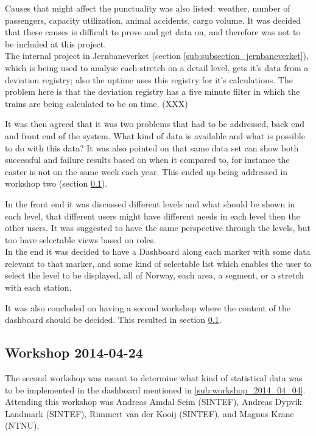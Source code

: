 Causes that might affect the punctuality was also listed: weather, number of
passengers, capacity utilization, animal accidents, cargo volume.
It was decided that these causes is difficult to prove and get data on, and
therefore was not to be included at this project.\\

The internal project in Jernbaneverket (section
\ref{sub:subsection_jernbaneverket}), which is being used to analyse each
stretch on a detail level, gets it's data from a deviation registry; also the
uptime uses this registry for it's calculations. The problem here is that the deviation registry has a five minute filter
in which the trains are being calculated to be on time. (XXX)

It was then agreed that it was two problems that had to be addressed, back end
and front end of the system. What kind of data is available and what is
possible to do with this data? It was also pointed on that same data set can 
show both successful and failure results based on when it compared to, for 
instance the easter is not on the same week each year. This ended up being 
addressed in workshop two (section \ref{sub:workshop_2014_04_24}). 

In the front end it was discussed different levels and what should be shown in
each level, that different users might have different needs in each level then
the other users. It was suggested to have the same perspective through the
levels, but too have selectable views based on roles. \\

In the end it was decided to have a Dashboard along each marker with some data
relevant to that marker, and some kind of selectable list which enables the
user to select the level to be displayed, all of Norway, each area, a segment,
or a stretch with each station. 

It was also concluded on having a second workshop where the content of the
dashboard should be decided. This resulted in section \ref{sub:workshop_2014_04_24}.


\clearpage
\subsection{Workshop 2014-04-24} %
\label{sub:workshop_2014_04_24}
The second workshop was meant to determine what kind of statistical data was 
to be implemented in the dashboard mentioned in \ref{sub:workshop_2014_04_04}.
Attending this workshop was Andreas Amdal Seim (SINTEF), Andreas Dypvik 
Landmark (SINTEF), Rimmert van der Kooij (SINTEF), and Magnus Krane (NTNU).\\

